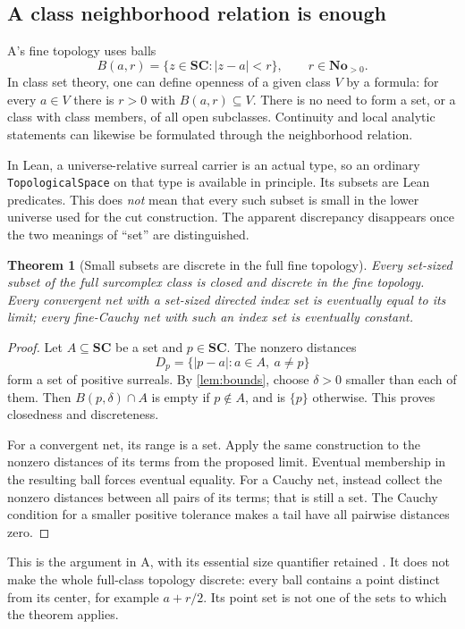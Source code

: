 \documentclass[11pt,letterpaper]{article}
\numberwithin{equation}{section}
\newtheorem{theorem}{Theorem}[section]
\theoremstyle{definition}
\theoremstyle{remark}
\newcommand{\No}{\mathbf{No}}
\newcommand{\SC}{\mathbf{SC}}
\begin{document}
\subsection{A class neighborhood relation is enough}
A's fine topology uses balls
\[
B(a,r)=\{z\in\SC:|z-a|<r\},\qquad r\in\No_{>0}.
\]
In class set theory, one can define openness of a given class $V$ by a formula: for every $a\in V$ there is $r>0$ with $B(a,r)\subseteq V$. There is no need to form a set, or a class with class members, of all open subclasses. Continuity and local analytic statements can likewise be formulated through the neighborhood relation.

In Lean, a universe-relative surreal carrier is an actual type, so an ordinary \texttt{TopologicalSpace} on that type is available in principle. Its subsets are Lean predicates. This does \emph{not} mean that every such subset is small in the lower universe used for the cut construction. The apparent discrepancy disappears once the two meanings of ``set'' are distinguished.

\begin{theorem}[Small subsets are discrete in the full fine topology]\label{thm:discrete}
Every set-sized subset of the full surcomplex class is closed and discrete in the fine topology. Every convergent net with a set-sized directed index set is eventually equal to its limit; every fine-Cauchy net with such an index set is eventually constant.
\end{theorem}
\begin{proof}
Let $A\subseteq\SC$ be a set and $p\in\SC$. The nonzero distances
\[
D_p=\{|p-a|:a\in A,\ a\ne p\}
\]
form a set of positive surreals. By \cref{lem:bounds}, choose $\delta>0$ smaller than each of them. Then $B(p,\delta)\cap A$ is empty if $p\notin A$, and is $\{p\}$ otherwise. This proves closedness and discreteness.

For a convergent net, its range is a set. Apply the same construction to the nonzero distances of its terms from the proposed limit. Eventual membership in the resulting ball forces eventual equality. For a Cauchy net, instead collect the nonzero distances between all pairs of its terms; that is still a set. The Cauchy condition for a smaller positive tolerance makes a tail have all pairwise distances zero.
\end{proof}
This is the argument in A, with its essential size quantifier retained \cite{SourceA}. It does not make the whole full-class topology discrete: every ball contains a point distinct from its center, for example $a+r/2$. Its point set is not one of the sets to which the theorem applies.
\end{document}
